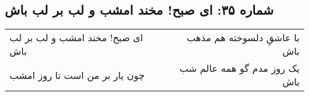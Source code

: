 \begin{center}
\section*{شماره ۳۵: ای صبح! مخند امشب و لب بر لب باش}
\label{sec:035}
\begin{longtable}{l p{0.5cm} r}
ای صبح! مخند امشب و لب بر لب باش
&&
با عاشقِ دلسوخته هم مذهب باش
\\
چون یار بر من است تا روز امشب
&&
یک روز مدم گو همه عالم شب باش
\\
\end{longtable}
\end{center}
